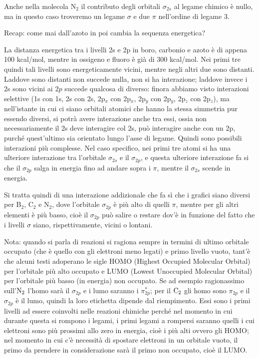 Anche nella molecola N$_2$ il contributo degli orbitali $\sigma_{2s}$ al legame chimico è nullo, ma in questo caso troveremo un legame $\sigma$ e due $\pi$ nell'ordine di legame 3.

\vspace{0.2cm}Recap: come mai dall'azoto in poi cambia la sequenza energetica?

La distanza energetica tra i livelli 2s e 2p in boro, carbonio e azoto è di appena 100 kcal/mol, mentre in ossigeno e fluoro è già di 300 kcal/mol. Nei primi tre quindi tali livelli sono energeticamente vicini, mentre negli altri due sono distanti. Laddove sono distanti non succede nulla, non si ha interazione; laddove invece i 2s sono vicini ai $2p$ succede qualcosa di diverso: finora abbiamo visto interazioni selettive (1s con 1s, 2s con 2s, 2p$_x$ con 2p$_x$, 2p$_y$ con 2p$_y$, 2p$_z$ con 2p$_z$), ma nell'istante in cui ci siano orbitali atomici che hanno la stessa simmetria pur essendo diversi, si potrà avere interazione anche tra essi, ossia non necessariamente il 2s deve interagire col 2s, può interagire anche con un 2p, purché quest'ultimo sia orientato lungo l'asse di legame. Quindi sono possibili interazioni più complesse. Nel caso specifico, nei primi tre atomi si ha una ulteriore interazione tra l'orbitale $\sigma_{2s}$ e il $\sigma_{2p}$, e questa ulteriore interazione fa si che il $\sigma_{2p}$ salga in energia fino ad andare sopra i $\pi$, mentre il $\sigma_{2s}$ scende in energia.

Si tratta quindi di una interazione addizionale che fa sì che i grafici siano diversi per B$_2$, C$_2$ e N$_2$, dove l'orbitale $\sigma_{2p}$ è più alto di quelli $\pi$, mentre per gli altri elementi è più basso, cioè il $\sigma_{2p}$ può salire o restare dov'è in funzione del fatto che i livelli $\sigma$ siano, rispettivamente, vicini o lontani.

\vspace{0.2cm}Nota: quando si parla di reazioni si ragiona sempre in termini di ultimo orbitale occupato (che è quello con gli elettroni meno legati) e primo livello vuoto, tant'è che alcuni testi adoperano le sigle HOMO (Highest Occupied Molecular Orbital) per l'orbitale più alto occupato e LUMO (Lowest Unoccupied Molecular Orbital) per l'orbitale più basso (in energia) non occupato. Se ad esempio ragionassimo sull'$\rm N_2$ l'homo sarà il $\sigma_{2p}$ e i lumo saranno i $\pi^*_{2p}$; per il $\rm C_2$ gli homo sono $\pi_{2p}$ e il $\sigma_{2p}$ è il lumo, quindi la loro etichetta dipende dal riempimento. Essi sono i primi livelli ad essere coinvolti nelle reazioni chimiche perché nel momento in cui durante questa si rompono i legami, i primi legami a rompersi saranno quelli i cui elettroni sono più prossimi allo zero in energia, cioè i più alti ovvero gli HOMO; nel momento in cui c'è necessità di spostare elettroni in un orbitale vuoto, il primo da prendere in considerazione sarà il primo non occupato, cioè il LUMO.

